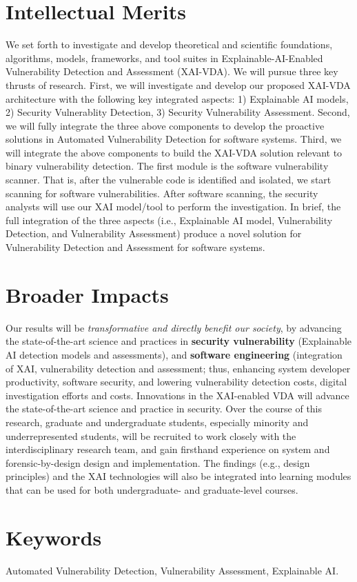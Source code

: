 \documentclass[11pt]{article}
\begin{document}
\section {Intellectual Merits}

We set forth to investigate and develop theoretical and scientific
foundations, algorithms, models, frameworks, and tool suites in
Explainable-AI-Enabled Vulnerability Detection and Assessment
(XAI-VDA). We will pursue three key thrusts of research. First, we
will investigate and develop our proposed XAI-VDA architecture with
the following key integrated aspects: 1) Explainable AI models, 2)
Security Vulnerablity Detection, 3) Security Vulnerability
Assessment. Second, we will fully integrate the three above components
to develop the proactive solutions in Automated Vulnerability
Detection for software systems. Third, we will integrate the above
components to build the XAI-VDA solution relevant to binary
vulnerability detection. The first module is the software
vulnerability scanner.  That is, after the vulnerable code is
identified and isolated, we start scanning for software
vulnerabilities.  After software scanning,
the security analysts will use our XAI model/tool to perform the
investigation. In brief, the full integration of the three aspects
(i.e., Explainable AI model, Vulnerability Detection, and
Vulnerability Assessment) produce a novel solution for Vulnerability
Detection and Assessment for software systems.

\section{Broader Impacts}

Our results will be {\em transformative and directly benefit our
  society}, by advancing the state-of-the-art science and practices in
{\bf security vulnerability} (Explainable AI detection models and
assessments), and {\bf software engineering} (integration of XAI,
vulnerability detection and assessment; thus, enhancing system
developer productivity, software security, and lowering vulnerability
detection costs, digital investigation efforts and costs.  Innovations
in the XAI-enabled VDA will advance the state-of-the-art science and
practice in security. Over the course of this research, graduate and
undergraduate students, especially minority and underrepresented
students, will be recruited to work closely with the interdisciplinary
research team, and gain firsthand experience on system and
forensic-by-design design and implementation. The findings (e.g.,
design principles) and the XAI technologies will also be integrated
into learning modules that can be used for both undergraduate- and
graduate-level courses.

\section{Keywords}
Automated Vulnerability Detection, Vulnerability Assessment,
Explainable AI.




\end{document}
